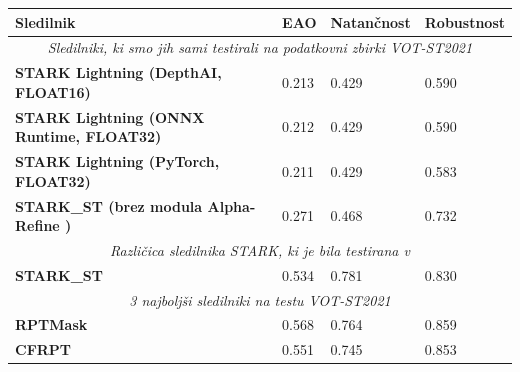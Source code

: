 \documentclass[a4paper,12pt,openright]{book}
\begin{document}
\begin{table}[htb]
    \begin{tabular}{p{}|p{}|p{}|p{}}    %
        {\bf \scriptsize Sledilnik }                                              & {\bf \scriptsize EAO} & {\bf \scriptsize Natančnost} & {\bf \scriptsize Robustnost} \\
        \hline
        \multicolumn{4}{c}{\footnotesize\emph{Sledilniki, ki smo jih sami testirali na podatkovni zbirki VOT-ST2021 \cite{vot2021}}}                                    \\
        \hline
        \bf \scriptsize STARK Lightning \tiny (DepthAI, FLOAT16)                  & 0.213                 & 0.429                        & 0.590                        \\
        \bf \scriptsize STARK Lightning \tiny (ONNX Runtime, FLOAT32)             & 0.212                 & 0.429                        & 0.590                        \\
        \bf \scriptsize STARK Lightning \tiny (PyTorch, FLOAT32)                  & 0.211                 & 0.429                        & 0.583                        \\
        \bf \scriptsize STARK\_ST \tiny(brez modula Alpha-Refine \cite{alpharef}) & 0.271                 & 0.468                        & 0.732                        \\
        \hline
        \multicolumn{4}{c}{\footnotesize \emph{Različica sledilnika STARK, ki je bila testirana v \cite{vot2021}}}                                                      \\
        \hline
        \bf \scriptsize STARK\_ST                                                 & 0.534                 & 0.781                        & 0.830                        \\
        \hline
        \multicolumn{4}{c}{\footnotesize \emph{3 najboljši sledilniki na testu VOT-ST2021 \cite{vot2021}}}                                                              \\
        \hline
        \bf \scriptsize RPTMask                                                   & 0.568                 & 0.764                        & 0.859                        \\
        \bf \scriptsize CFRPT                                                     & 0.551                 & 0.745                        & 0.853                        \\

\end{tabular}
\end{table}
\end{document}
